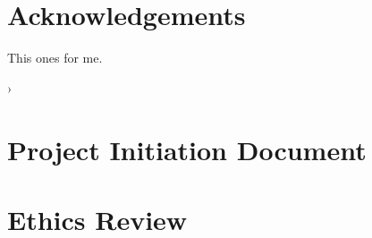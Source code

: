 \documentclass[12pt, a4paper]{report}
\begin{document}
\chapter*{Acknowledgements}
This ones for me.
\newpage





% 
% 





% 








\begin{appendices}›
  \newpage

  \chapter{Project Initiation Document}
   \label{appendix:AppendixPID}

  \chapter{Ethics Review}
  
\end{appendices}

\newpage
{}
{}
\printbibliography
\end{document}
